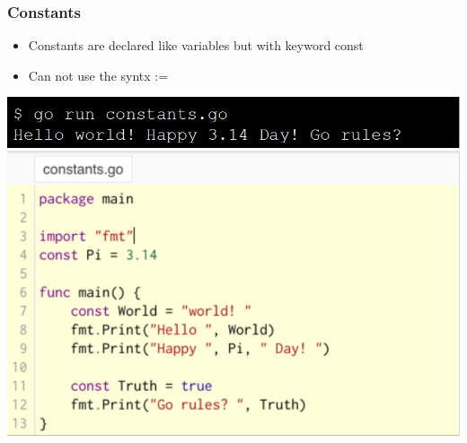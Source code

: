 \documentclass[14pt]{beamer}
\begin{document}
{
\begin{frame}
    \frametitle{Constants}
    \begin{itemize}
        \item Constants are declared like variables but with keyword const
        \item Can not use the syntx :=
    \end{itemize}
    \begin{center}
        \includegraphics[width=0.6\linewidth]{img/constants.PNG}
    \end{center}
\end{frame}
}
\end{document}
